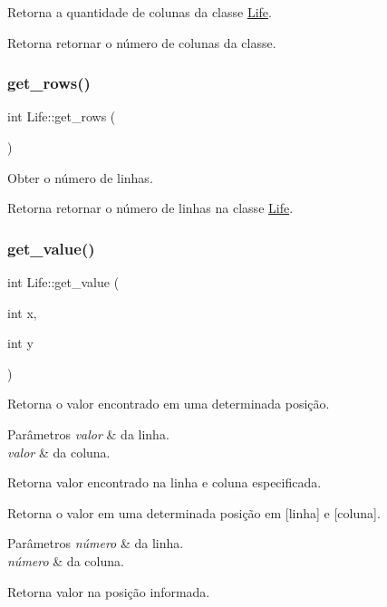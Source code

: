 Retorna a quantidade de colunas da classe \hyperlink{classLife}{Life}. \begin{DoxyReturn}{Retorna}
retornar o número de colunas da classe. 
\end{DoxyReturn}
\mbox{\label{classLife_ae4a3608385b8435f55102c89363d6e26}} 
\subsubsection{\texorpdfstring{get\+\_\+rows()}{get\_rows()}}
{\footnotesize\ttfamily int Life\+::get\+\_\+rows (\begin{DoxyParamCaption}{ }\end{DoxyParamCaption})}

Obter o número de linhas. \begin{DoxyReturn}{Retorna}
retornar o número de linhas na classe \hyperlink{classLife}{Life}. 
\end{DoxyReturn}
\mbox{\label{classLife_a84991971ca97509cc769ad527f010585}} 
\subsubsection{\texorpdfstring{get\+\_\+value()}{get\_value()}}
{\footnotesize\ttfamily int Life\+::get\+\_\+value (\begin{DoxyParamCaption}\item[{int}]{x,  }\item[{int}]{y }\end{DoxyParamCaption})}

Retorna o valor encontrado em uma determinada posição. 
\begin{DoxyParams}{Parâmetros}
{\em valor} & da linha. \\
\hline
{\em valor} & da coluna. \\
\hline
\end{DoxyParams}
\begin{DoxyReturn}{Retorna}
valor encontrado na linha e coluna especificada.
\end{DoxyReturn}
Retorna o valor em uma determinada posição em \mbox{[}linha\mbox{]} e \mbox{[}coluna\mbox{]}. 
\begin{DoxyParams}{Parâmetros}
{\em número} & da linha. \\
\hline
{\em número} & da coluna. \\
\hline
\end{DoxyParams}
\begin{DoxyReturn}{Retorna}
valor na posição informada. 
\end{DoxyReturn}
\mbox{\label{classLife_a7b7cd244c2ce5b7d6ed0db9a188b2256}} 
